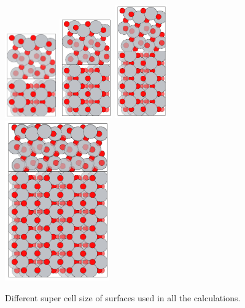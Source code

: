 \documentclass[aip,amsmath,amssymb,reprint, jcp]{revtex4-1}
\begin{document}
\begin{figure}
\centering
\includegraphics[width=0.2\textwidth]{TiO2_101sur_2by1supercell.png}
\includegraphics[width=0.2\textwidth]{TiO2_101sur_3by1supercell.png}
\includegraphics[width=0.2\textwidth]{TiO2_101sur_4by1supercell.png}
\includegraphics[width=0.4\textwidth]{TiO2_101sur_6by2supercell.png}
\caption{Different super cell size of surfaces used in all the calculations.}
\label{fig:exptobser}
\end{figure}
\end{document}
